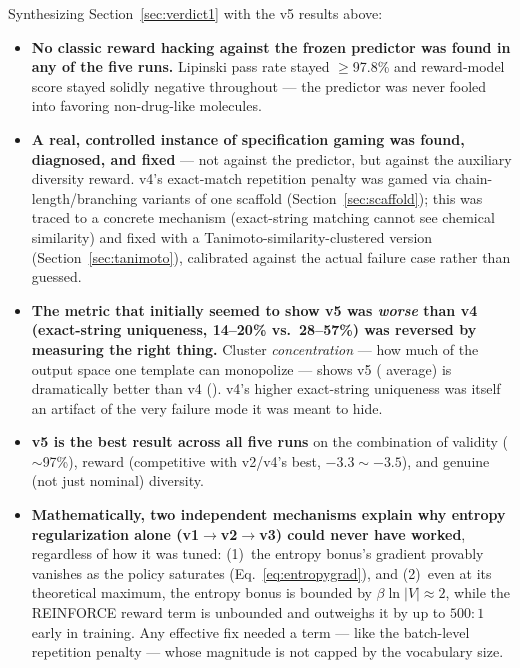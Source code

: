 \documentclass[11pt]{article}
\begin{document}
Synthesizing Section~\ref{sec:verdict1} with the v5 results above:

\begin{itemize}
  \item \textbf{No classic reward hacking against the frozen predictor was found in any of the five runs.} Lipinski pass rate stayed $\geq$97.8\% and reward-model score stayed solidly negative throughout --- the predictor was never fooled into favoring non-drug-like molecules.
  \item \textbf{A real, controlled instance of specification gaming was found, diagnosed, and fixed} --- not against the predictor, but against the auxiliary diversity reward. v4's exact-match repetition penalty was gamed via chain-length/branching variants of one scaffold (Section~\ref{sec:scaffold}); this was traced to a concrete mechanism (exact-string matching cannot see chemical similarity) and fixed with a Tanimoto-similarity-clustered version (Section~\ref{sec:tanimoto}), calibrated against the actual failure case rather than guessed.
  \item \textbf{The metric that initially seemed to show v5 was \emph{worse} than v4 (exact-string uniqueness, 14--20\% vs.\ 28--57\%) was reversed by measuring the right thing.} Cluster \emph{concentration} --- how much of the output space one template can monopolize --- shows v5 ( average) is dramatically better than v4 (). v4's higher exact-string uniqueness was itself an artifact of the very failure mode it was meant to hide.
  \item \textbf{v5 is the best result across all five runs} on the combination of validity ($\sim$97\%), reward (competitive with v2/v4's best, $-3.3\sim-3.5$), and genuine (not just nominal) diversity.
  \item \textbf{Mathematically, two independent mechanisms explain why entropy regularization alone (v1$\to$v2$\to$v3) could never have worked}, regardless of how it was tuned: (1)~the entropy bonus's gradient provably vanishes as the policy saturates (Eq.~\ref{eq:entropygrad}), and (2)~even at its theoretical maximum, the entropy bonus is bounded by $\beta\ln|V|\approx2$, while the REINFORCE reward term is unbounded and outweighs it by up to $500{:}1$ early in training. Any effective fix needed a term --- like the batch-level repetition penalty --- whose magnitude is not capped by the vocabulary size.
\end{itemize}
\end{document}
